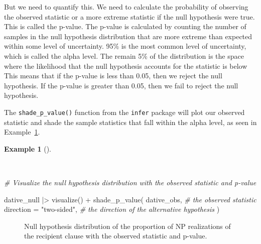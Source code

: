 \documentclass[
  letterpaper,
  DIV=11,
  numbers=noendperiod]{scrreprt}
\newenvironment{Shaded}{\begin{snugshade}}{\end{snugshade}}
\newcommand{\AttributeTok}[1]{\textcolor[rgb]{0.00,0.00,0.00}{#1}}
\newcommand{\CommentTok}[1]{\textcolor[rgb]{0.00,0.00,0.00}{\textit{#1}}}
\newcommand{\FunctionTok}[1]{\textcolor[rgb]{0.00,0.00,0.00}{#1}}
\newcommand{\NormalTok}[1]{\textcolor[rgb]{0.00,0.00,0.00}{#1}}
\newcommand{\SpecialCharTok}[1]{\textcolor[rgb]{0.00,0.00,0.00}{#1}}
\newcommand{\StringTok}[1]{\textcolor[rgb]{0.00,0.00,0.00}{#1}}
\theoremstyle{definition}
\newtheorem{example}{Example}[chapter]
\theoremstyle{remark}
\begin{document}
But we need to quantify this. We need to calculate the probability of
observing the observed statistic or a more extreme statistic if the null
hypothesis were true. This is called the p-value. The p-value is
calculated by counting the number of samples in the null hypothesis
distribution that are more extreme than expected within some level of
uncertainty. 95\% is the most common level of uncertainty, which is
called the alpha level. The remain 5\% of the distribution is the space
where the likelihood that the null hypothesis accounts for the statistic
is below This means that if the p-value is less than 0.05, then we
reject the null hypothesis. If the p-value is greater than 0.05, then we
fail to reject the null hypothesis.

The \texttt{shade\_p\_value()} function from the \texttt{infer} package
will plot our observed statistic and shade the sample statistics that
fall within the alpha level, as seen in
Example~\ref{exm-ida-cat-null-hypothesis-obs-pval}.

\begin{example}[]\protect\hypertarget{exm-ida-cat-null-hypothesis-obs-pval}{}\label{exm-ida-cat-null-hypothesis-obs-pval}

~

\begin{Shaded}
\begin{Highlighting}[]
\CommentTok{\# Visualize the null hypothesis distribution with the observed statistic and p{-}value}

\NormalTok{dative\_null }\SpecialCharTok{|\textgreater{}}
  \FunctionTok{visualize}\NormalTok{() }\SpecialCharTok{+}
  \FunctionTok{shade\_p\_value}\NormalTok{(}
\NormalTok{    dative\_obs, }\CommentTok{\# the observed statistic}
    \AttributeTok{direction =} \StringTok{"two{-}sided"}\NormalTok{, }\CommentTok{\# the direction of the alternative hypothesis}
\NormalTok{  )}
\end{Highlighting}
\end{Shaded}

\begin{figure}[H]


\caption{\label{fig-ida-cat-null-hypothesis-obs-pval}Null hypothesis
distribution of the proportion of NP realizations of the recipient
clause with the observed statistic and p-value.}

\end{figure}%

\end{example}
\end{document}

